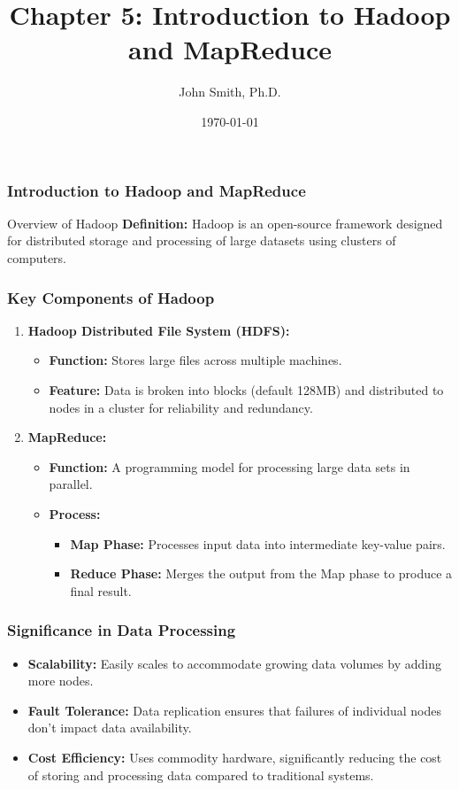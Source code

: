 \documentclass[aspectratio=169]{beamer}
\title[Introduction to Hadoop and MapReduce]{Chapter 5: Introduction to Hadoop and MapReduce}
\author[J. Smith]{John Smith, Ph.D.}
\institute[University Name]{
  Department of Computer Science\\
  University Name\\
  \vspace{0.3cm}
  Email: email@university.edu\\
  Website: www.university.edu
}
\date{\today}
\begin{document}
\frame{\titlepage}

\begin{frame}[fragile]
    \frametitle{Introduction to Hadoop and MapReduce}
    \begin{block}{Overview of Hadoop}
        \textbf{Definition:}  
        Hadoop is an open-source framework designed for distributed storage and processing of large datasets using clusters of computers.
    \end{block}
\end{frame}

\begin{frame}[fragile]
    \frametitle{Key Components of Hadoop}
    \begin{enumerate}
        \item \textbf{Hadoop Distributed File System (HDFS):}  
            \begin{itemize}
                \item \textbf{Function:} Stores large files across multiple machines.
                \item \textbf{Feature:} Data is broken into blocks (default 128MB) and distributed to nodes in a cluster for reliability and redundancy.
            \end{itemize}
        
        \item \textbf{MapReduce:}  
            \begin{itemize}
                \item \textbf{Function:} A programming model for processing large data sets in parallel.
                \item \textbf{Process:}
                    \begin{itemize}
                        \item \textbf{Map Phase:} Processes input data into intermediate key-value pairs.
                        \item \textbf{Reduce Phase:} Merges the output from the Map phase to produce a final result.
                    \end{itemize}
            \end{itemize}
    \end{enumerate}
\end{frame}

\begin{frame}[fragile]
    \frametitle{Significance in Data Processing}
    \begin{itemize}
        \item \textbf{Scalability:} Easily scales to accommodate growing data volumes by adding more nodes.
        \item \textbf{Fault Tolerance:} Data replication ensures that failures of individual nodes don’t impact data availability.
        \item \textbf{Cost Efficiency:} Uses commodity hardware, significantly reducing the cost of storing and processing data compared to traditional systems.
    \end{itemize}
\end{frame}
\end{document}
